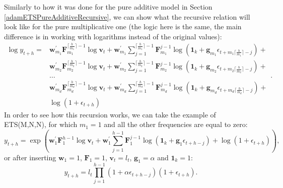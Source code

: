 \documentclass[]{book}
\theoremstyle{definition}
\theoremstyle{definition}
\theoremstyle{definition}
\theoremstyle{definition}
\theoremstyle{remark}
\begin{document}
Similarly to how it was done for the pure additive model in Section \ref{adamETSPureAdditiveRecursive}, we can show what the recursive relation will look like for the pure multiplicative one (the logic here is the same, the main difference is in working with logarithms instead of the original values):
\begin{equation}
  \begin{aligned}
    \log y_{t+h} = & \mathbf{w}_{m_1}^\prime \mathbf{F}_{m_1}^{\lceil\frac{h}{m_1}\rceil-1} \log \mathbf{v}_{t} + \mathbf{w}_{m_1}^\prime \sum_{j=1}^{\lceil\frac{h}{m_1}\rceil-1} \mathbf{F}_{m_1}^{j-1} \log \left(\mathbf{1}_k + \mathbf{g}_{m_1} \epsilon_{t+m_1\lceil\frac{h}{m_1}\rceil-j}\right) + \\
    & \mathbf{w}_{m_2}^\prime \mathbf{F}_{m_2}^{\lceil\frac{h}{m_2}\rceil-1} \log \mathbf{v}_{t} + \mathbf{w}_{m_2}^\prime \sum_{j=1}^{\lceil\frac{h}{m_2}\rceil-1} \mathbf{F}_{m_2}^{j-1} \log \left(\mathbf{1}_k + \mathbf{g}_{m_2} \epsilon_{t+m_2\lceil\frac{h}{m_2}\rceil-j}\right) + \\
    & \dots \\
    & \mathbf{w}_{m_d}^\prime \mathbf{F}_{m_d}^{\lceil\frac{h}{m_d}\rceil-1} \log \mathbf{v}_{t} + \mathbf{w}_{m_d}^\prime \sum_{j=1}^{\lceil\frac{h}{m_d}\rceil-1} \mathbf{F}_{m_d}^{j-1} \log \left(\mathbf{1}_k + \mathbf{g}_{m_d} \epsilon_{t+m_d\lceil\frac{h}{m_d}\rceil-j}\right) + \\
    & \log \left(1 + \epsilon_{t+h}\right)
  \end{aligned}.
  \label{eq:ETSADAMStateSpacePureMultiplicativeRecursion}
\end{equation}
In order to see how this recursion works, we can take the example of ETS(M,N,N), for which \(m_1=1\) and all the other frequencies are equal to zero:
\begin{equation}
    y_{t+h} = \exp\left(\mathbf{w}_{1}^\prime \mathbf{F}_{1}^{h-1} \log\mathbf{v}_{t} + \mathbf{w}_{1}^\prime \sum_{j=1}^{h-1} \mathbf{F}_{1}^{j-1} \log \left(\mathbf{1}_k + \mathbf{g}_{1} \epsilon_{t+h-j}\right) +\log \left(1 + \epsilon_{t+h}\right)\right) ,
  \label{eq:ETSMNNADAMStateSpacePureMultiplicativeRecursion01}
\end{equation}
or after inserting \(\mathbf{w}_{1}=1\), \(\mathbf{F}_{1}=1\), \(\mathbf{v}_{t}=l_t\), \(\mathbf{g}_{1}=\alpha\) and \(\mathbf{1}_k=1\):
\begin{equation}
    y_{t+h} = l_t \prod_{j=1}^{h-1} \left(1 + \alpha \epsilon_{t+h-j}\right) \left(1 + \epsilon_{t+h}\right) .
  \label{eq:ETSMNNADAMStateSpacePureMultiplicativeRecursion02}
\end{equation}
\end{document}
